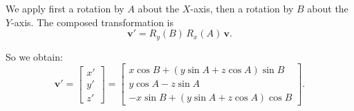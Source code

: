 \documentclass{article}
\begin{document}
We apply first a rotation by $A$ about the $X$-axis, then a rotation by $B$ about the $Y$-axis. The composed transformation is
\[
\bm{v}' = R_y(B)\,R_x(A)\,\bm{v}.
\]

So we obtain:
\[
\bm{v}' = \begin{bmatrix} x' \\ y' \\ z' \end{bmatrix}
= \begin{bmatrix}
x\cos B + (y\sin A + z\cos A)\sin B \\
y\cos A - z\sin A \\
- x\sin B + (y\sin A + z\cos A)\cos B
\end{bmatrix}.
\]
\end{document}
